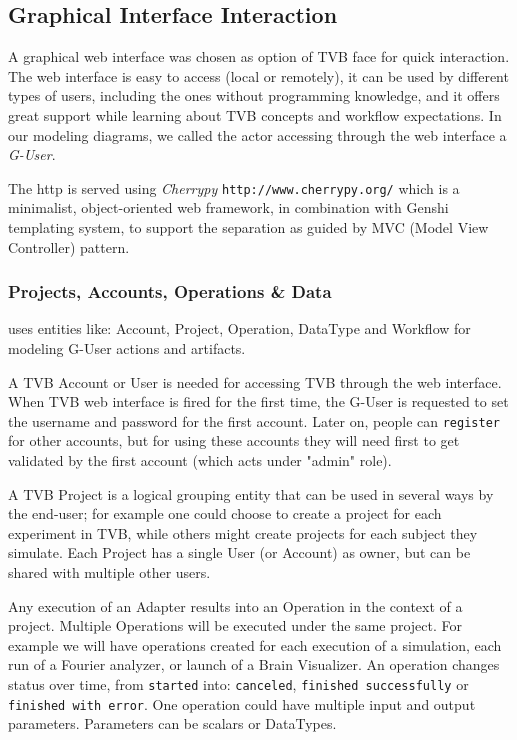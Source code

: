 
\subsection{Graphical Interface Interaction}

A graphical web interface was chosen as option of TVB face for quick interaction. The web interface is easy to access (local or remotely),
it can be used by different types of users, including the ones without programming knowledge, and it offers great 
support while learning about TVB concepts and workflow expectations. 
In our modeling diagrams, we called the actor accessing \TVB through the web interface a \emph{G-User}.

The http is served using \emph{Cherrypy} \texttt{http://www.cherrypy.org/} which is a minimalist, object-oriented web framework, 
in combination with Genshi templating system, to support the separation as guided by MVC (Model View Controller) pattern.

	\subsubsection{Projects, Accounts, Operations \& Data}

\TVB uses entities like: Account, Project, Operation, DataType and Workflow for modeling G-User actions and artifacts. 

 A TVB Account or User is needed for accessing TVB through the web interface. 
 When TVB web interface is fired for the first time, the G-User is requested to set the username and password for the first account.
Later on, people can \texttt{register} for other accounts, but for using these accounts they will need first to get validated by the 
first account (which acts under "admin" role).

A TVB Project is a logical grouping entity that  can be used in several ways by the end-user; 
for example one could choose to create a project for each experiment in TVB, while others might create projects for each subject they simulate.
Each Project has a single User (or Account) as owner, but can be shared with multiple other users.

Any execution of an Adapter results into an Operation in the context of a project. Multiple Operations will be executed under the same project.
For example we will have operations created for each execution of a simulation, each run of a Fourier analyzer, or launch of a Brain Visualizer.
An operation changes status over time, from \texttt{started} into: \texttt{canceled}, \texttt{finished successfully} or \texttt{finished with error}.
One operation could have multiple input and output parameters. Parameters can be scalars or DataTypes.

